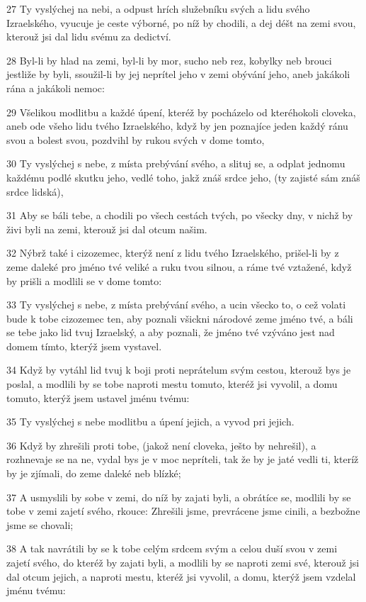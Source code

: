 \par 27 Ty vyslýchej na nebi, a odpust hrích služebníku svých a lidu svého Izraelského, vyucuje je ceste výborné, po níž by chodili, a dej déšt na zemi svou, kterouž jsi dal lidu svému za dedictví.
\par 28 Byl-li by hlad na zemi, byl-li by mor, sucho neb rez, kobylky neb brouci jestliže by byli, ssoužil-li by jej neprítel jeho v zemi obývání jeho, aneb jakákoli rána a jakákoli nemoc:
\par 29 Všelikou modlitbu a každé úpení, kteréž by pocházelo od kteréhokoli cloveka, aneb ode všeho lidu tvého Izraelského, když by jen poznajíce jeden každý ránu svou a bolest svou, pozdvihl by rukou svých v dome tomto,
\par 30 Ty vyslýchej s nebe, z místa prebývání svého, a slituj se, a odplat jednomu každému podlé skutku jeho, vedlé toho, jakž znáš srdce jeho, (ty zajisté sám znáš srdce lidská),
\par 31 Aby se báli tebe, a chodili po všech cestách tvých, po všecky dny, v nichž by živi byli na zemi, kterouž jsi dal otcum našim.
\par 32 Nýbrž také i cizozemec, kterýž není z lidu tvého Izraelského, prišel-li by z zeme daleké pro jméno tvé veliké a ruku tvou silnou, a ráme tvé vztažené, když by prišli a modlili se v dome tomto:
\par 33 Ty vyslýchej s nebe, z místa prebývání svého, a ucin všecko to, o cež volati bude k tobe cizozemec ten, aby poznali všickni národové zeme jméno tvé, a báli se tebe jako lid tvuj Izraelský, a aby poznali, že jméno tvé vzýváno jest nad domem tímto, kterýž jsem vystavel.
\par 34 Když by vytáhl lid tvuj k boji proti neprátelum svým cestou, kterouž bys je poslal, a modlili by se tobe naproti mestu tomuto, kteréž jsi vyvolil, a domu tomuto, kterýž jsem ustavel jménu tvému:
\par 35 Ty vyslýchej s nebe modlitbu a úpení jejich, a vyvod pri jejich.
\par 36 Když by zhrešili proti tobe, (jakož není cloveka, ješto by nehrešil), a rozhnevaje se na ne, vydal bys je v moc nepríteli, tak že by je jaté vedli ti, kteríž by je zjímali, do zeme daleké neb blízké;
\par 37 A usmyslili by sobe v zemi, do níž by zajati byli, a obrátíce se, modlili by se tobe v zemi zajetí svého, rkouce: Zhrešili jsme, prevrácene jsme cinili, a bezbožne jsme se chovali;
\par 38 A tak navrátili by se k tobe celým srdcem svým a celou duší svou v zemi zajetí svého, do kteréž by zajati byli, a modlili by se naproti zemi své, kterouž jsi dal otcum jejich, a naproti mestu, kteréž jsi vyvolil, a domu, kterýž jsem vzdelal jménu tvému:
